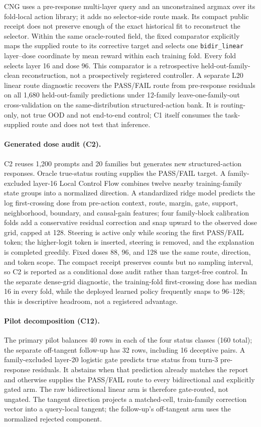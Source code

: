CNG uses a pre-response multi-layer query and an unconstrained argmax over its fold-local action
library; it adds no selector-side route mask. Its compact public receipt does not preserve enough
of the exact historical fit to reconstruct the selector. Within the same oracle-routed field, the
fixed comparator explicitly maps the supplied route to its corrective target and selects one
\texttt{bidir\_linear} layer--dose coordinate by mean reward within each training fold. Every fold
selects layer 16 and dose 96. This comparator is a retrospective held-out-family-clean
reconstruction, not a prospectively registered controller. A separate L20 linear route diagnostic recovers the PASS/FAIL route from pre-response residuals
on all 1,680 held-out-family predictions under 12-family leave-one-family-out cross-validation
on the same-distribution structured-action bank. It is routing-only, not true OOD and not
end-to-end control; C1 itself consumes the task-supplied route and does not test that inference.

\paragraph{Generated dose audit (C2).}
C2 reuses 1,200 prompts and 20 families but generates new structured-action responses. Oracle
true-status routing supplies the PASS/FAIL target. A family-excluded layer-16 Local Control Flow
combines twelve nearby training-family state groups into a normalized direction. A standardized
ridge model predicts the log first-crossing dose from pre-action context, route, margin, gate,
support, neighborhood, boundary, and causal-gain features; four family-block calibration folds add
a conservative residual correction and snap upward to the observed dose grid, capped at 128.
Steering is active only while scoring the first PASS/FAIL token; the higher-logit token is inserted,
steering is removed, and the explanation is completed greedily. Fixed doses 88, 96, and 128 use
the same route, direction, and token scope. The compact receipt preserves counts but no sampling
interval, so C2 is reported as a conditional dose audit rather than target-free control.
In the separate dense-grid diagnostic, the training-fold first-crossing dose has median 16 in
every fold, while the deployed learned policy frequently snaps to 96--128; this is descriptive
headroom, not a registered advantage.

\paragraph{Pilot decomposition (C12).}
The primary pilot balances 40 rows in each of the four status classes (160 total); the separate
off-tangent follow-up has 32 rows, including 16 deceptive pairs. A family-excluded layer-20
logistic gate predicts true status from turn-3 pre-response residuals. It abstains when that
prediction already matches the report and otherwise supplies the PASS/FAIL route to every
bidirectional and explicitly gated arm. The raw bidirectional linear arm is therefore gate-routed,
not ungated. The tangent direction projects a matched-cell, train-family correction vector into a
query-local tangent; the follow-up's off-tangent arm uses the normalized rejected component.


